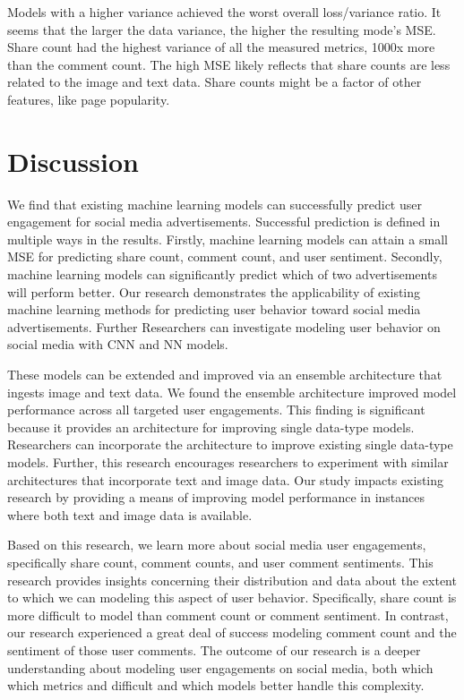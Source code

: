 \documentclass[mksc,blindrev]{informs3} %
\begin{document}
Models with a higher variance achieved the worst overall loss/variance ratio.  It seems that the larger the data variance, the higher the resulting mode's MSE.  Share count had the highest variance of all the measured metrics, 1000x more than the comment count.  The high MSE likely reflects that share counts are less related to the image and text data. Share counts might be a factor of other features, like page popularity.

\section{Discussion}



We find that existing machine learning models can successfully predict user engagement for social media advertisements. Successful prediction is defined in multiple ways in the results. Firstly, machine learning models can attain a small MSE for predicting share count, comment count, and user sentiment. Secondly, machine learning models can significantly predict which of two advertisements will perform better. Our research demonstrates the applicability of existing machine learning methods for predicting user behavior toward social media advertisements. Further Researchers can investigate modeling user behavior on social media with CNN and NN models.

These models can be extended and improved via an ensemble architecture that ingests image and text data. We found the ensemble architecture improved model performance across all targeted user engagements. This finding is significant because it provides an architecture for improving single data-type models. Researchers can incorporate the architecture to improve existing single data-type models. Further, this research encourages researchers to experiment with similar architectures that incorporate text and image data. Our study impacts existing research by providing a means of improving model performance in instances where both text and image data is available.

Based on this research, we learn more about social media user engagements, specifically share count, comment counts, and user comment sentiments. This research provides insights concerning their distribution and data about the extent to which we can modeling this aspect of user behavior. Specifically, share count is more difficult to model than comment count or comment sentiment. In contrast, our research experienced a great deal of success modeling comment count and the sentiment of those user comments. The outcome of our research is a deeper understanding about modeling user engagements on social media, both which which metrics and difficult and which models better handle this complexity.
\end{document}
